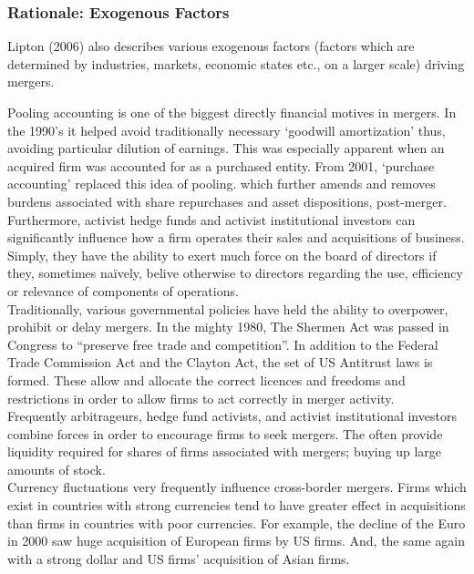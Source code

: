 \documentclass[11pt, english]{article}
\begin{document}
		\subsubsection*{Rationale: Exogenous Factors}

	Lipton (2006) also describes various exogenous factors (factors which are determined by industries, markets, economic states etc., on a larger scale) driving mergers.

	Pooling accounting is one of the biggest directly financial motives in mergers. In the 1990's it helped avoid traditionally necessary `goodwill amortization' thus, avoiding particular dilution of earnings. This was especially apparent when an acquired firm was accounted for as a purchased entity. From 2001, `purchase accounting' replaced this idea of pooling. which further amends and removes burdens associated with share repurchases and asset dispositions, post-merger.\\

	Furthermore, activist hedge funds and activist institutional investors can significantly influence how a firm operates their sales and acquisitions of business. Simply, they have the ability to exert much force on the board of directors if they, sometimes na\"{i}vely, belive otherwise to directors regarding the use, efficiency or relevance of components of operations.\\

	Traditionally, various governmental policies have held the ability to overpower, prohibit or delay mergers. In the mighty 1980, The Shermen Act was passed in Congress to ``preserve free trade and competition''. In addition to the Federal Trade Commission Act and the Clayton Act, the set of US Antitrust laws is formed. These allow and allocate the correct licences and freedoms and restrictions in order to allow firms to act correctly in merger activity.\\

	Frequently arbitrageurs, hedge fund activists, and activist institutional investors combine forces in order to encourage firms to seek mergers. The often provide liquidity required for shares of firms associated with mergers; buying up large amounts of stock.\\

	Currency fluctuations very frequently influence cross-border mergers. Firms which exist in countries with strong currencies tend to have greater effect in acquisitions than firms in countries with poor currencies. For example, the decline of the Euro in 2000 saw huge acquisition of European firms by US firms. And, the same again with a strong dollar and US firms' acquisition of Asian firms.\\
\end{document}
